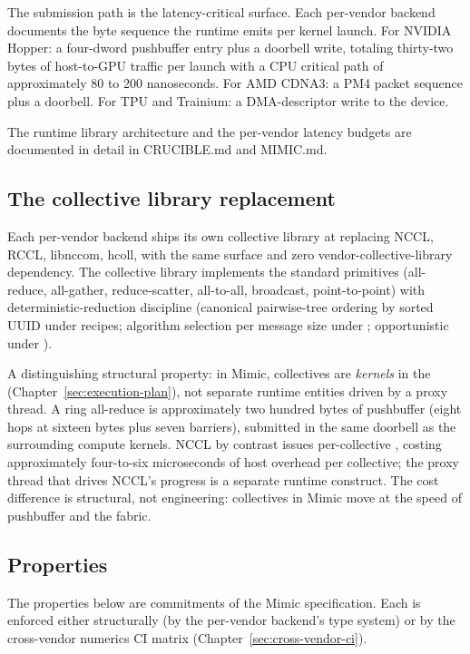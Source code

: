 The submission path is the latency-critical surface.
Each per-vendor backend documents the byte sequence the runtime emits per kernel launch.
For NVIDIA Hopper: a four-dword pushbuffer entry plus a doorbell write, totaling thirty-two bytes of host-to-GPU traffic per launch with a CPU critical path of approximately 80 to 200 nanoseconds.
For AMD CDNA3: a PM4 packet sequence plus a doorbell.
For TPU and Trainium: a DMA-descriptor write to the device.

The runtime library architecture and the per-vendor latency budgets are documented in detail in CRUCIBLE.md and MIMIC.md.

\subsection{The collective library replacement}
\label{sec:mimic-collective}

Each per-vendor backend ships its own collective library at  replacing NCCL, RCCL, libnccom, hcoll, with the same surface and zero vendor-collective-library dependency.
The collective library implements the standard primitives (all-reduce, all-gather, reduce-scatter, all-to-all, broadcast, point-to-point) with deterministic-reduction discipline (canonical pairwise-tree ordering by sorted UUID under  recipes; algorithm selection per message size under ; opportunistic under ).

A distinguishing structural property: in Mimic, collectives are \emph{kernels} in the  (Chapter~\ref{sec:execution-plan}), not separate runtime entities driven by a proxy thread.
A ring all-reduce is approximately two hundred bytes of pushbuffer (eight hops at sixteen bytes plus seven barriers), submitted in the same doorbell as the surrounding compute kernels.
NCCL by contrast issues per-collective , costing approximately four-to-six microseconds of host overhead per collective; the proxy thread that drives NCCL's progress is a separate runtime construct.
The cost difference is structural, not engineering: collectives in Mimic move at the speed of pushbuffer and the fabric.

\subsection{Properties}
\label{sec:mimic-properties}

The properties below are commitments of the Mimic specification.
Each is enforced either structurally (by the per-vendor backend's type system) or by the cross-vendor numerics CI matrix (Chapter~\ref{sec:cross-vendor-ci}).


